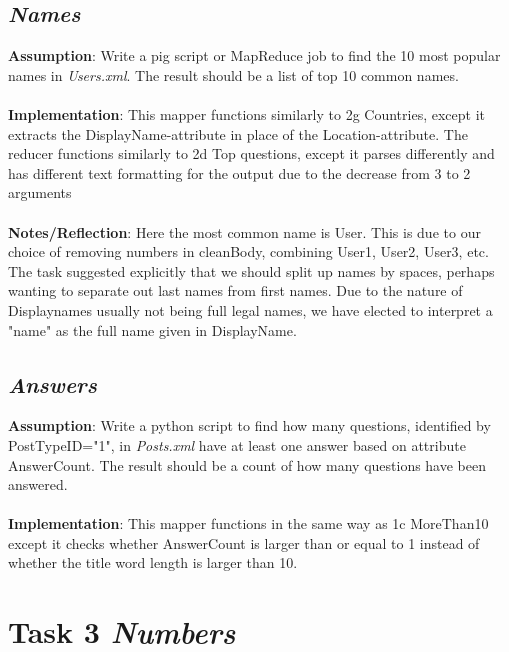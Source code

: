 \documentclass[fleqn,10pt]{wlscirep}
\begin{document}
\subsection{\emph{Names}}
\textbf{Assumption}: Write a pig script or MapReduce job to find the 10 most popular names in \textit{Users.xml}. The result should be a list of top 10 common names. \\ \\
\textbf{Implementation}: This mapper functions similarly to 2g Countries, except it extracts the DisplayName-attribute in place of the Location-attribute. The reducer functions similarly to 2d Top questions, except it parses differently and has different text formatting for the output due to the decrease from 3 to 2 arguments \\ \\
\textbf{Notes/Reflection}: Here the most common name is User. This is due to our choice of removing numbers in cleanBody, combining User1, User2, User3, etc. The task suggested explicitly that we should split up names by spaces, perhaps wanting to separate out last names from first names. Due to the nature of Displaynames usually not being full legal names, we have elected to interpret a "name" as the full name given in DisplayName.



\subsection{\emph{Answers}}
\textbf{Assumption}: Write a python script to find how many questions, identified by PostTypeID="1", in \textit{Posts.xml} have at least one answer based on attribute AnswerCount. The result should be a count of how many questions have been answered. \\ \\
\textbf{Implementation}: This mapper functions in the same way as 1c MoreThan10 except it checks whether AnswerCount is larger than or equal to 1 instead of whether the title word length is larger than 10.


\section{Task 3 \emph{Numbers}}
\end{document}
